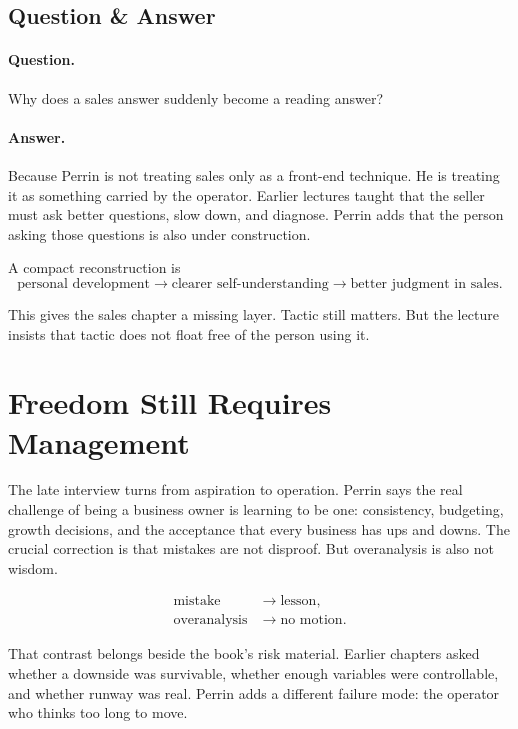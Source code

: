 \documentclass[11pt,oneside]{book}
\begin{document}
\subsection{Question \& Answer}

\paragraph{Question.}
Why does a sales answer suddenly become a reading answer?

\paragraph{Answer.}
Because Perrin is not treating sales only as a front-end technique. He is treating it as something carried by the operator. Earlier lectures taught that the seller must ask better questions, slow down, and diagnose. Perrin adds that the person asking those questions is also under construction.

A compact reconstruction is
\begin{equation}
\text{personal development}
\to
\text{clearer self-understanding}
\to
\text{better judgment in sales}.
\end{equation}

This gives the sales chapter a missing layer. Tactic still matters. But the lecture insists that tactic does not float free of the person using it.

\section{Freedom Still Requires Management}

The late interview turns from aspiration to operation. Perrin says the real challenge of being a business owner is learning to be one: consistency, budgeting, growth decisions, and the acceptance that every business has ups and downs. The crucial correction is that mistakes are not disproof. But overanalysis is also not wisdom.

\begin{align}
\text{mistake} &\to \text{lesson},\\
\text{overanalysis} &\to \text{no motion}.
\end{align}

That contrast belongs beside the book's risk material. Earlier chapters asked whether a downside was survivable, whether enough variables were controllable, and whether runway was real. Perrin adds a different failure mode: the operator who thinks too long to move.
\end{document}
